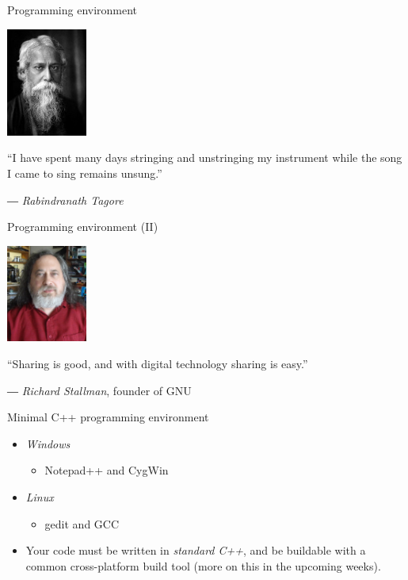 \documentclass[10pt]{beamer}
\begin{document}
\begin{frame}[label={sec:org60c86ad}]{Programming environment}
\begin{center}
\includegraphics[width=100px]{./tagore.jpg}
\end{center}

\begin{QUOTATION}
“I have spent many days stringing and unstringing my instrument 
while the song I came to sing remains unsung.”

― \emph{Rabindranath Tagore}
\end{QUOTATION}
\end{frame}
\begin{frame}[label={sec:org547dc8e}]{Programming environment (II)}
\begin{center}
\includegraphics[width=100px]{./stallman.jpg}
\end{center}

\begin{QUOTATION}
“Sharing is good, and with digital technology sharing is easy.”

― \emph{Richard Stallman}, founder of GNU
\end{QUOTATION}
\end{frame}
\begin{frame}[label={sec:org0a61e72}]{Minimal C++ programming environment}
\begin{itemize}
\item \emph{Windows}
\begin{itemize}
\item \alert{Notepad++} and \alert{CygWin}
\end{itemize}
\item \emph{Linux}
\begin{itemize}
\item \alert{gedit} and \alert{GCC}
\end{itemize}
\item Your code must be written in \emph{standard C++}, and be buildable with a common
cross-platform build tool (more on this in the upcoming weeks).
\end{itemize}
\end{frame}
\end{document}
